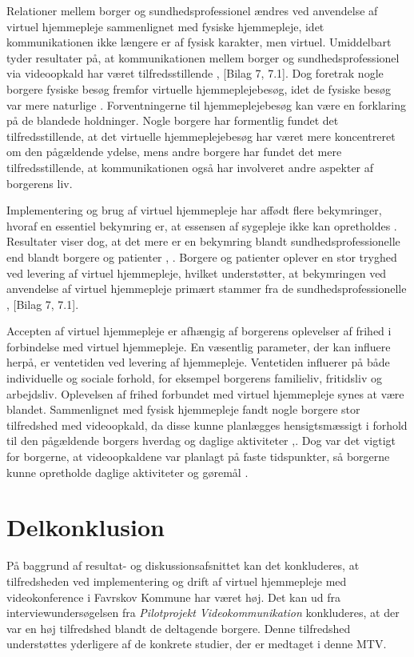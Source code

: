Relationer mellem borger og sundhedsprofessionel ændres ved anvendelse af virtuel hjemmepleje sammenlignet med fysiske hjemmepleje, idet kommunikationen ikke længere er af fysisk karakter, men virtuel. Umiddelbart tyder resultater på, at kommunikationen mellem borger og sundhedsprofessionel via videoopkald har været tilfredsstillende \cite{Baf2}, [Bilag 7, 7.1]. Dog foretrak nogle borgere fysiske besøg fremfor virtuelle hjemmeplejebesøg, idet de fysiske besøg var mere naturlige \cite{kandidat}. 
Forventningerne til hjemmeplejebesøg kan være en forklaring på de blandede holdninger. Nogle borgere har formentlig fundet det tilfredsstillende, at det virtuelle hjemmeplejebesøg har været mere koncentreret om den pågældende ydelse, mens andre borgere har fundet det mere tilfredsstillende, at kommunikationen også har involveret andre aspekter af borgerens liv.

Implementering og brug af virtuel hjemmepleje har affødt flere bekymringer, hvoraf en essentiel bekymring er, at essensen af sygepleje ikke kan opretholdes \cite{telenursing}. Resultater viser dog, at det mere er en bekymring blandt sundhedsprofessionelle end blandt borgere og patienter \cite{telenursing}, \cite{Mair}. Borgere og patienter oplever en stor tryghed ved levering af virtuel hjemmepleje, hvilket understøtter, at bekymringen ved anvendelse af virtuel hjemmepleje primært stammer fra de sundhedsprofessionelle \cite{Baf2}, [Bilag 7, 7.1]. 

Accepten af virtuel hjemmepleje er afhængig af borgerens oplevelser af frihed i forbindelse med virtuel hjemmepleje. En væsentlig parameter, der kan influere herpå, er ventetiden ved levering af hjemmepleje. Ventetiden influerer på både individuelle og sociale forhold, for eksempel borgerens familieliv, fritidsliv og arbejdsliv. Oplevelsen af frihed forbundet med virtuel hjemmepleje synes at være blandet. Sammenlignet med fysisk hjemmepleje fandt nogle borgere stor tilfredshed med videoopkald, da disse kunne planlægges hensigtsmæssigt i forhold til den pågældende borgers hverdag og daglige aktiviteter \cite{kandidat},\cite{wade}. Dog var det vigtigt for borgerne, at videoopkaldene var planlagt på faste tidspunkter, så borgerne kunne opretholde daglige aktiviteter og gøremål \cite{kandidat}.

\section{Delkonklusion}
På baggrund af resultat- og diskussionsafsnittet kan det konkluderes, at tilfredsheden ved implementering og drift af virtuel hjemmepleje med videokonference i Favrskov Kommune har været høj. Det kan ud fra interviewundersøgelsen fra \textit{Pilotprojekt Videokommunikation} konkluderes, at der var en høj tilfredshed blandt de deltagende borgere. Denne tilfredshed understøttes yderligere af de konkrete studier, der er medtaget i denne MTV.

